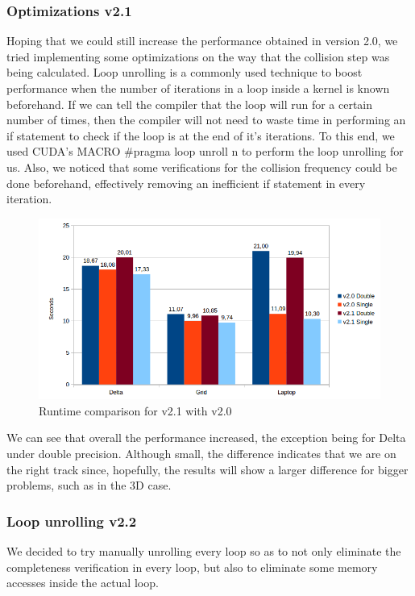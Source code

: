 \documentclass[12pt]{book}
\begin{document}
\subsubsection{Optimizations v2.1}
Hoping that we could still increase the performance obtained in version 2.0, we tried implementing some optimizations on the way that the collision step was being calculated. Loop unrolling is a commonly used technique to boost performance when the number of iterations in a loop inside a kernel is known beforehand. If we can tell the compiler that the loop will run for a certain number of times, then the compiler will not need to waste time in performing an if statement to check if the loop is at the end of it's iterations. To this end, we used CUDA's MACRO \#pragma loop unroll n to perform the loop unrolling for us. Also, we noticed that some verifications for the collision frequency could be done beforehand, effectively removing an inefficient if statement in every iteration.

  \begin{figure}[H]
  	\centering
  	\includegraphics[width=\linewidth]{Resources/Images/v21.png}
  	\caption{Runtime comparison for v2.1 with v2.0}
  	\label{fig:v21}
  \end{figure}
  
 We can see that overall the performance increased, the exception being for Delta under double precision. Although small, the difference indicates that we are on the right track since, hopefully, the results will show a larger difference for bigger problems, such as in the 3D case.
 
\subsubsection{Loop unrolling v2.2}
We decided to try manually unrolling every loop so as to not only eliminate the completeness verification in every loop, but also to eliminate some memory accesses inside the actual loop.
\end{document}
